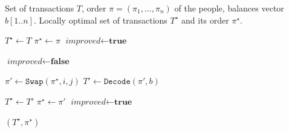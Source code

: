 \begin{algorithmic}[1]
    \INPUT  Set of transactions $T$, order $\pi = (\pi_1, \dots, \pi_n)$ of the people, balances vector $b[1..n]$.
    \OUTPUT Locally optimal set of transactions $T^\star$ and its order $\pi^\star$.

    \State $T^\star \leftarrow T$
    \State $\pi^\star \leftarrow \pi$
    \State $\textit{improved} \leftarrow \textbf{true}$

        \State $\textit{improved} \leftarrow \textbf{false}$

                \State $\pi' \leftarrow \texttt{Swap}(\pi^\star, i, j)$
                \State $T' \leftarrow \texttt{Decode}(\pi', b)$

                    \State $T^\star \leftarrow T'$
                    \State $\pi^\star \leftarrow \pi'$
                    \State $\textit{improved} \leftarrow \textbf{true}$
                \EndIf
            \EndFor
        \EndFor
    \EndWhile

    \State \Return $(T^\star, \pi^\star)$

\end{algorithmic}